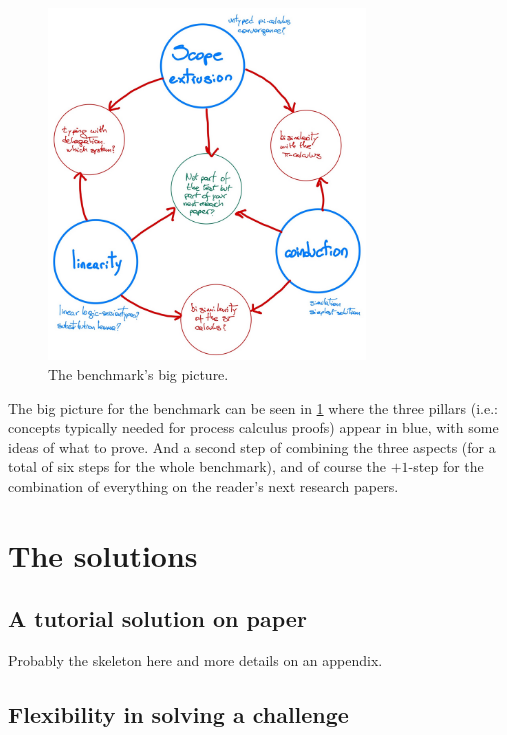 \documentclass{article}
\begin{document}
\begin{figure}[h]
  \centering
  \includegraphics[width=0.75\textwidth]{images/benchmark.jpeg}
  \caption{The benchmark's big picture.}
  \label{fig:bigpic}
\end{figure}

The big picture for the benchmark can be seen in \cref{fig:bigpic}
where the three pillars (i.e.: concepts typically needed for process
calculus proofs) appear in blue, with some ideas of what to prove. And
a second step of combining the three aspects (for a total of six steps
for the whole benchmark), and of course the $+1$-step for the
combination of everything on the reader's next research papers.



\section{The solutions}\label{sec:solutions}

\subsection{A tutorial solution on paper}\label{sec:tutorial}

Probably the skeleton here and more details on an appendix.

\subsection{Flexibility in solving a challenge}
\end{document}
